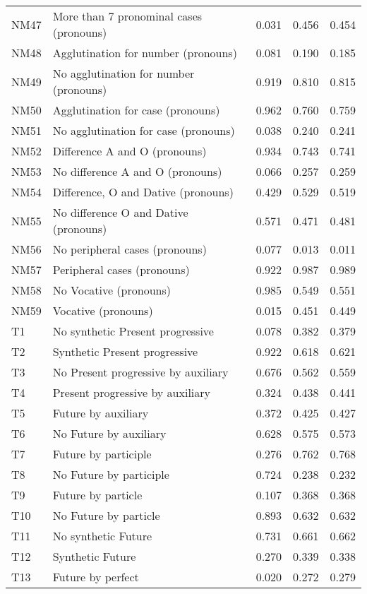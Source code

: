 \begin{longtable}{lllll}
NM47 & More than 7 pronominal cases (pronouns) & 0.031 & 0.456 & 0.454\\
NM48 & Agglutination for number (pronouns) & 0.081 & 0.190 & 0.185\\
NM49 & No agglutination for number (pronouns) & 0.919 & 0.810 & 0.815\\
NM50 & Agglutination for case (pronouns) & 0.962 & 0.760 & 0.759\\
NM51 & No agglutination for case (pronouns) & 0.038 & 0.240 & 0.241\\
NM52 & Difference A and O (pronouns) & 0.934 & 0.743 & 0.741\\
NM53 & No difference A and O (pronouns) & 0.066 & 0.257 & 0.259\\
NM54 & Difference, O and Dative (pronouns) & 0.429 & 0.529 & 0.519\\
NM55 & No difference O and Dative (pronouns) & 0.571 & 0.471 & 0.481\\
NM56 & No peripheral cases (pronouns) & 0.077 & 0.013 & 0.011\\
NM57 & Peripheral cases (pronouns) & 0.922 & 0.987 & 0.989\\
NM58 & No Vocative (pronouns) & 0.985 & 0.549 & 0.551\\
NM59 & Vocative (pronouns) & 0.015 & 0.451 & 0.449\\
T1 & No synthetic Present progressive & 0.078 & 0.382 & 0.379\\
T2 & Synthetic Present progressive & 0.922 & 0.618 & 0.621\\
T3 & No Present progressive by auxiliary & 0.676 & 0.562 & 0.559\\
T4 & Present progressive by auxiliary & 0.324 & 0.438 & 0.441\\
T5 & Future by auxiliary & 0.372 & 0.425 & 0.427\\
T6 & No Future by auxiliary & 0.628 & 0.575 & 0.573\\
T7 & Future by participle & 0.276 & 0.762 & 0.768\\
T8 & No Future by participle & 0.724 & 0.238 & 0.232\\
T9 & Future by particle & 0.107 & 0.368 & 0.368\\
T10 & No Future by particle & 0.893 & 0.632 & 0.632\\
T11 & No synthetic Future & 0.731 & 0.661 & 0.662\\
T12 & Synthetic Future & 0.270 & 0.339 & 0.338\\
T13 & Future by perfect & 0.020 & 0.272 & 0.279\\

\end{longtable}
